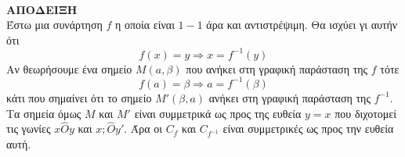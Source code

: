 \\
\textbf{ΑΠΟΔΕΙΞΗ}\\
Έστω μια συνάρτηση $ f $ η οποία είναι $ 1-1 $ άρα και αντιστρέψιμη. Θα ισχύει γι αυτήν ότι
\[ f(x)=y\Rightarrow x=f^{-1}(y) \]
Αν θεωρήσουμε ένα σημείο $ M(a,\beta) $ που ανήκει στη γραφική παράσταση της $ f $ τότε
\[ f(a)=\beta\Rightarrow a=f^{-1}(\beta) \]
κάτι που σημαίνει ότι το σημείο $ M'(\beta,a) $ ανήκει στη γραφική παράσταση της $ f^{-1} $. Τα σημεία όμως $ M $ και $ M' $ είναι συμμετρικά ως προς της ευθεία $ y=x $ που διχοτομεί τις γωνίες $ x\hat{O}y $ και $ x;\hat{O}y' $. Άρα οι $ C_f $ και $ C_{f^{-1}} $ είναι συμμετρικές ως προς την ευθεία αυτή.
